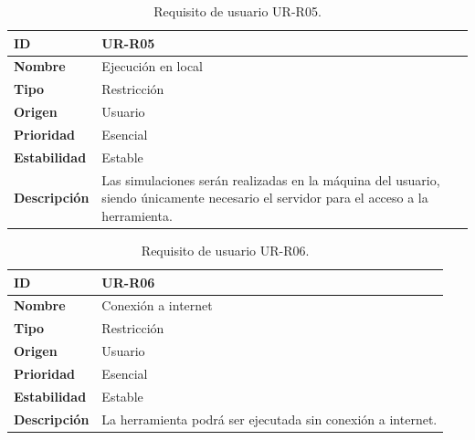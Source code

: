 \begin{center}
\begin{table}[htbp]
\centering
\begin{tabular}{@{}p{2.5cm} p{9cm}@{}} 
\toprule
\textbf{ID} 				& UR-R05 \\
\midrule
\textbf{Nombre} 			& Ejecución en local \\
\midrule
\textbf{Tipo} 			& Restricción \\
\midrule
\textbf{Origen} 			& Usuario \\
\midrule
\textbf{Prioridad}		& Esencial \\
\midrule
\textbf{Estabilidad} 		& Estable \\
\midrule
\textbf{Descripción} 	& Las simulaciones serán realizadas en la máquina del usuario, siendo únicamente necesario el servidor para el acceso a la herramienta. \\
\bottomrule
\end{tabular}
\caption{Requisito de usuario UR-R05.}
\label{tab:urr05}
\end{table}
\end{center}

\begin{center}
\begin{table}[htbp]
\centering
\begin{tabular}{@{}p{2.5cm} p{9cm}@{}} 
\toprule
\textbf{ID} 				& UR-R06 \\
\midrule
\textbf{Nombre} 			& Conexión a internet \\
\midrule
\textbf{Tipo} 			& Restricción \\
\midrule
\textbf{Origen} 			& Usuario \\
\midrule
\textbf{Prioridad}		& Esencial \\
\midrule
\textbf{Estabilidad} 		& Estable \\
\midrule
\textbf{Descripción} 	& La herramienta podrá ser ejecutada sin conexión a internet. \\
\bottomrule
\end{tabular}
\caption{Requisito de usuario UR-R06.}
\label{tab:urr06}
\end{table}
\end{center}

